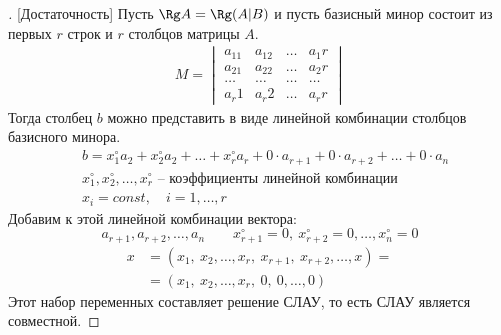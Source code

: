 \begin{proof}[][Достаточность]
	Пусть $\Rg A = \Rg (A|B)$ и пусть базисный минор состоит из первых $r$ строк и $r$ столбцов матрицы $A$. \vspace{-\topsep}
	\begin{gather*}
		M = \begin{vmatrix} 
			a_11 & a_12 & \ldots & a_1r \\
			a_21 & a_22 & \ldots & a_2r \\
			\ldots & \ldots & \ldots & \ldots\\
			a_r1 & a_r2 & \ldots & a_rr 
		\end{vmatrix} 
	\end{gather*}
	Тогда столбец $b$ можно представить в виде линейной комбинации столбцов базисного минора.
	\begin{align*} 
		&b = x_1^\circ a_2 + x_2^\circ a_2 + \ldots + x_r^\circ a_r + 0\cdot a_{r+1} + 0\cdot a_{r+2} + \ldots + 0\cdot a_n\\
		&x_1^\circ, x_2^\circ,\ldots, x_r^\circ \text{ -- коэффициенты линейной комбинации}\\
		&x_i = const,\quad i=1, \ldots, r
	\end{align*}
	Добавим к этой линейной комбинации вектора:
	\[ a_{r+1},a_{r+2},\ldots,a_n \qquad x_{r+1}^\circ = 0,\ x_{r+2}^\circ = 0,\ldots,x_n^\circ = 0 \] \vspace{-3\topsep}
	\begin{align*}
		x &= (x_1,\ x_2, \ldots, x_r,\ x_{r+1},\ x_{r+2},\ldots,x) = \\
		&= (x_1,\ x_2, \ldots,  x_r,\ 0,\ 0,\ldots, 0)
	\end{align*}
	Этот набор переменных составляет решение СЛАУ, то есть СЛАУ является совместной.
\end{proof}

\newpage
